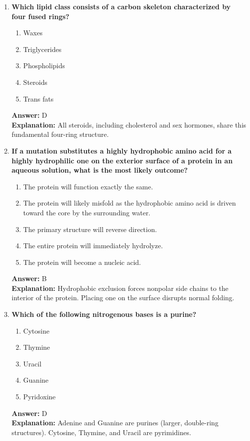 \documentclass[11pt, a4paper]{article}
\begin{document}
\begin{enumerate}
\item \textbf{Which lipid class consists of a carbon skeleton characterized by four fused rings?}
\begin{enumerate}[label=\Alph*.]
    \item Waxes
    \item Triglycerides
    \item Phospholipids
    \item Steroids
    \item Trans fats
\end{enumerate}
\textbf{Answer:} D \\
\textbf{Explanation:} All steroids, including cholesterol and sex hormones, share this fundamental four-ring structure.

\item \textbf{If a mutation substitutes a highly hydrophobic amino acid for a highly hydrophilic one on the exterior surface of a protein in an aqueous solution, what is the most likely outcome?}
\begin{enumerate}[label=\Alph*.]
    \item The protein will function exactly the same.
    \item The protein will likely misfold as the hydrophobic amino acid is driven toward the core by the surrounding water.
    \item The primary structure will reverse direction.
    \item The entire protein will immediately hydrolyze.
    \item The protein will become a nucleic acid.
\end{enumerate}
\textbf{Answer:} B \\
\textbf{Explanation:} Hydrophobic exclusion forces nonpolar side chains to the interior of the protein. Placing one on the surface disrupts normal folding.

\item \textbf{Which of the following nitrogenous bases is a purine?}
\begin{enumerate}[label=\Alph*.]
    \item Cytosine
    \item Thymine
    \item Uracil
    \item Guanine
    \item Pyridoxine
\end{enumerate}
\textbf{Answer:} D \\
\textbf{Explanation:} Adenine and Guanine are purines (larger, double-ring structures). Cytosine, Thymine, and Uracil are pyrimidines.


\end{enumerate}
\end{document}
